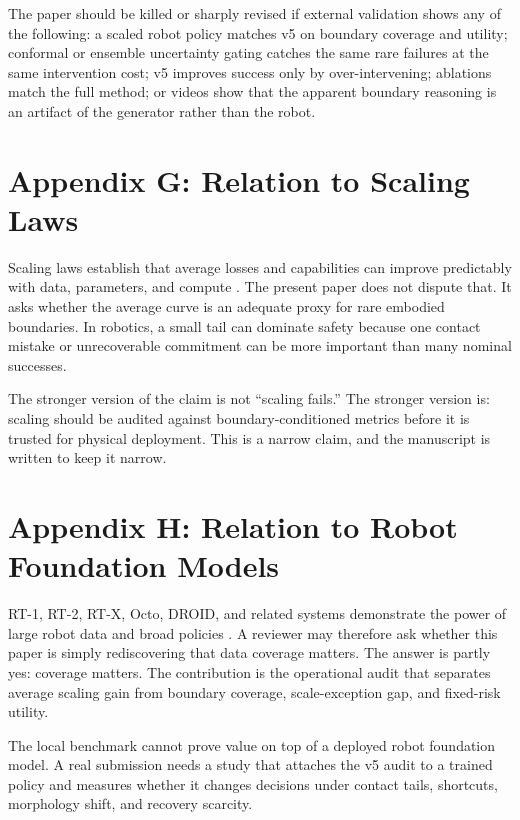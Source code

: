 \documentclass{article}
\begin{document}
The paper should be killed or sharply revised if external validation shows any of the following: a scaled robot policy matches v5 on boundary coverage and utility; conformal or ensemble uncertainty gating catches the same rare failures at the same intervention cost; v5 improves success only by over-intervening; ablations match the full method; or videos show that the apparent boundary reasoning is an artifact of the generator rather than the robot.


\section{Appendix G: Relation to Scaling Laws}
Scaling laws establish that average losses and capabilities can improve predictably with data, parameters, and compute \citep{mandlekar2021robomimic,thananjeyan2021recovery,angelopoulos2021conformal,kaelbling2013beliefspace,sun2025transforming1}. The present paper does not dispute that. It asks whether the average curve is an adequate proxy for rare embodied boundaries. In robotics, a small tail can dominate safety because one contact mistake or unrecoverable commitment can be more important than many nominal successes.

The stronger version of the claim is not ``scaling fails.'' The stronger version is: scaling should be audited against boundary-conditioned metrics before it is trusted for physical deployment. This is a narrow claim, and the manuscript is written to keep it narrow.


\section{Appendix H: Relation to Robot Foundation Models}
RT-1, RT-2, RT-X, Octo, DROID, and related systems demonstrate the power of large robot data and broad policies \citep{wang2026qwenvla2,pacaud2025scaling3,ma2026research4,pirbastindsegmentation5,lu2026omnieegbench6,chowdhury2025lagea7}. A reviewer may therefore ask whether this paper is simply rediscovering that data coverage matters. The answer is partly yes: coverage matters. The contribution is the operational audit that separates average scaling gain from boundary coverage, scale-exception gap, and fixed-risk utility.

The local benchmark cannot prove value on top of a deployed robot foundation model. A real submission needs a study that attaches the v5 audit to a trained policy and measures whether it changes decisions under contact tails, shortcuts, morphology shift, and recovery scarcity.
\end{document}
